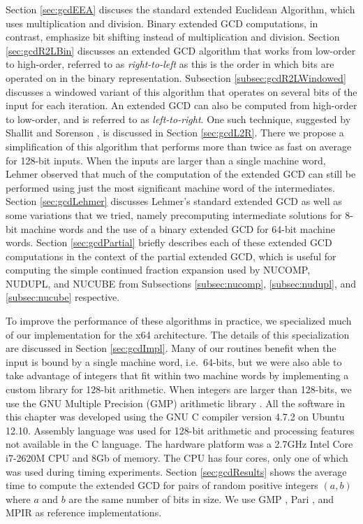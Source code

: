 \documentclass{ucalgthes1}
\theoremstyle{definition}
\newcommand{\compiler}{GNU C compiler version 4.7.2}
\newcommand{\cpu}{2.7GHz Intel Core i7-2620M CPU}
\begin{document}

Section \ref{sec:gcdEEA} discuses the standard extended Euclidean Algorithm, which uses multiplication and division.  Binary extended GCD computations, in contrast, emphasize bit shifting instead of multiplication and division.  Section \ref{sec:gcdR2LBin} discusses an extended GCD algorithm that works from low-order to high-order, referred to as \emph{right-to-left} as this is the order in which bits are operated on in the binary representation.  Subsection \ref{subsec:gcdR2LWindowed} discusses a windowed variant of this algorithm that operates on several bits of the input for each iteration.  An extended GCD can also be computed from high-order to low-order, and is referred to as \emph{left-to-right}.  One such technique, suggested by Shallit and Sorenson \cite{Shallit1994}, is discussed in Section \ref{sec:gcdL2R}.  There we propose a simplification of this algorithm that performs more than twice as fast on average for 128-bit inputs.  When the inputs are larger than a single machine word, Lehmer \cite{Lehmer1938} observed that much of the computation of the extended GCD can still be performed using just the most significant machine word of the intermediates.  Section \ref{sec:gcdLehmer} discusses Lehmer's standard extended GCD as well as some variations that we tried, namely precomputing intermediate solutions for 8-bit machine words and the use of a binary extended GCD for 64-bit machine words.  Section \ref{sec:gcdPartial} briefly describes each of these extended GCD computations in the context of the partial extended GCD, which is useful for computing the simple continued fraction expansion used by NUCOMP, NUDUPL, and NUCUBE from Subsections \ref{subsec:nucomp}, \ref{subsec:nudupl}, and \ref{subsec:nucube} respective.

To improve the performance of these algorithms in practice, we specialized much of our implementation for the x64 architecture.  The details of this specialization are discussed in Section \ref{sec:gcdImpl}.  Many of our routines benefit when the input is bound by a single machine word, i.e.\ 64-bits, but we were also able to take advantage of integers that fit within two machine words by implementing a custom library for 128-bit arithmetic.  When integers are larger than 128-bits, we use the GNU Multiple Precision (GMP) arithmetic library \cite{Gmp}.  All the software in this chapter was developed using the \compiler{} on Ubuntu 12.10.  Assembly language was used for 128-bit arithmetic and processing features not available in the C language.  The hardware platform was a \cpu{} and 8Gb of memory.  The CPU has four cores, only one of which was used during timing experiments.  Section \ref{sec:gcdResults} shows the average time to compute the extended GCD for pairs of random positive integers $(a, b)$ where $a$ and $b$ are the same number of bits in size.  We use GMP \cite{Gmp}, Pari \cite{PariGP}, and MPIR \cite{Mpir} as reference implementations.
\end{document}
